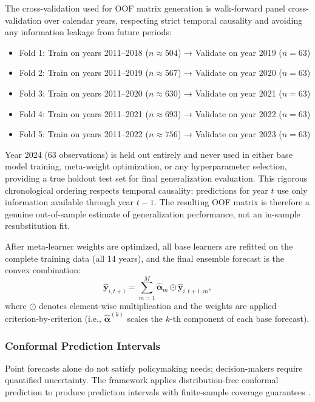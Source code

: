 \documentclass[12pt,a4paper]{article}
\begin{document}
The cross-validation used for OOF matrix generation is walk-forward panel cross-validation over calendar years, respecting strict temporal causality and avoiding any information leakage from future periods:
\begin{itemize}[itemsep=2pt]
  \item Fold 1: Train on years 2011--2018 ($n \approx 504$) → Validate on year 2019 ($n = 63$)
  \item Fold 2: Train on years 2011--2019 ($n \approx 567$) → Validate on year 2020 ($n = 63$)
  \item Fold 3: Train on years 2011--2020 ($n \approx 630$) → Validate on year 2021 ($n = 63$)
  \item Fold 4: Train on years 2011--2021 ($n \approx 693$) → Validate on year 2022 ($n = 63$)
  \item Fold 5: Train on years 2011--2022 ($n \approx 756$) → Validate on year 2023 ($n = 63$)
\end{itemize}
Year 2024 (63 observations) is held out entirely and never used in either base model training, meta-weight optimization, or any hyperparameter selection, providing a true holdout test set for final generalization evaluation. This rigorous chronological ordering respects temporal causality: predictions for year $t$ use only information available through year $t-1$. The resulting OOF matrix is therefore a genuine out-of-sample estimate of generalization performance, not an in-sample resubstitution fit.

After meta-learner weights are optimized, all base learners are refitted on the complete training data (all 14 years), and the final ensemble forecast is the convex combination:
\begin{equation}
\widehat{\mathbf{y}}_{i,t+1} = \sum_{m=1}^{M} \widehat{\boldsymbol{\alpha}}_m \odot \widehat{\mathbf{y}}_{i,t+1,m},
\end{equation}
where $\odot$ denotes element-wise multiplication and the weights are applied criterion-by-criterion (i.e., $\widehat{\boldsymbol{\alpha}}^{(k)}$ scales the $k$-th component of each base forecast).

\subsubsection{Conformal Prediction Intervals}

Point forecasts alone do not satisfy policymaking needs; decision-makers require quantified uncertainty. The framework applies distribution-free conformal prediction to produce prediction intervals with finite-sample coverage guarantees \citep{Vovk2005, Barber2023}.
\end{document}
